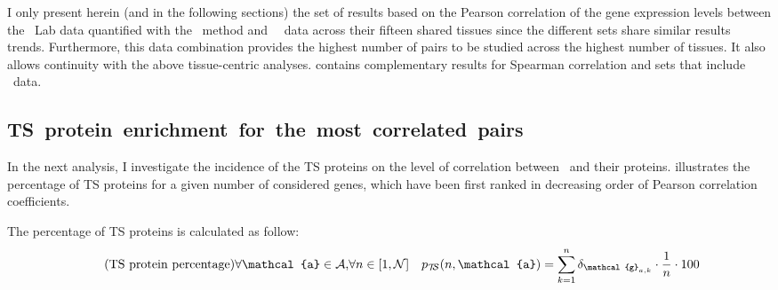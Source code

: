 I only present herein (and in the following sections)
the set of results based on the Pearson correlation of the gene expression levels
between the \pandey\ Lab data quantified with the \PPKM\ method
and \uhlen\ \etal\ data across their fifteen shared tissues
since the different sets share similar results trends.
Furthermore, this data combination provides the highest number of pairs
to be studied across the highest number of tissues.
It also allows continuity with the above tissue-centric analyses.
 contains complementary results
for Spearman correlation and sets that include \gtex\ data.\mybr\

\subsection{TS~protein~enrichment~for~the~most~correlated~pairs}
\vspace{-5mm}
In the next analysis,
I investigate the incidence of the \gls{TS} proteins
on the level of correlation between \mRNAs\ and their proteins.
 illustrates the percentage of \gls{TS} proteins
for a given number of considered genes,
which have been first ranked
in decreasing order of Pearson correlation coefficients.\mybr\

The percentage of \gls{TS} proteins is calculated as follow:
\begin{equation}
    \tag{TS protein percentage}
    \forall \mathcal{a} \in \mathcal{A}\text{,} \forall n \in [1,\mathcal{N}]
    \text{\quad}
    p_{\TSm} (n,\mathcal{a}) =%
    \displaystyle\sum_{k=1}^{n}\delta_{\mathcal{g}_{a,k}}\cdot\frac{1}{n}\cdot100
\end{equation}

